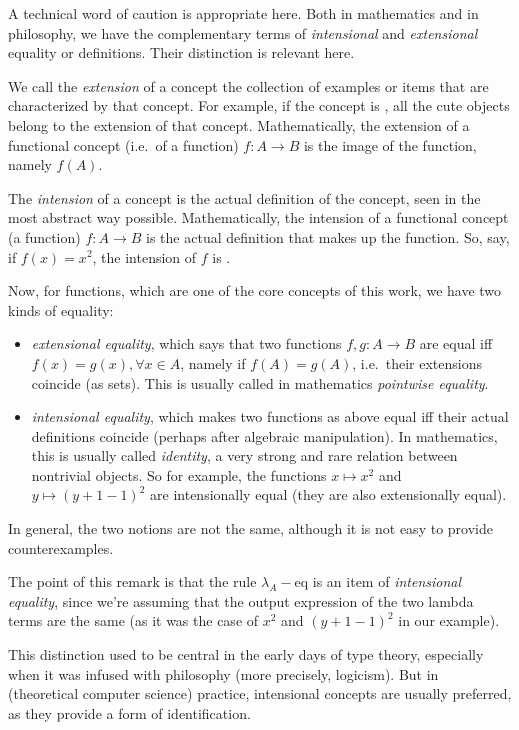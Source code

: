 \begin{remark}\label{rk:int-ext}
  A technical word of caution is appropriate here. Both in mathematics
  and in philosophy, we have the complementary terms of \emph{intensional}
  and \emph{extensional} equality or definitions. Their distinction is
  relevant here.

  We call the \emph{extension} of a concept the collection of examples
  or items that are characterized by that concept. For example, if the
  concept is , all the cute objects belong to the extension
  of that concept. Mathematically, the extension of a functional concept
  (i.e.\ of a function) $ f : A \to B $ is the image of the function,
  namely $ f(A) $.

  The \emph{intension} of a concept is the actual definition of the concept,
  seen in the most abstract way possible. Mathematically, the intension of a
  functional concept (a function) $ f : A \to B $ is the actual definition
  that makes up the function. So, say, if $ f(x) = x^2 $, the intension of
  $ f $ is .

  Now, for functions, which are one of the core concepts of this work,
  we have two kinds of equality:
  \begin{itemize}
  \item \emph{extensional equality}, which says that two functions
    $ f, g : A \to B $ are equal iff $ f(x) = g(x), \forall x \in A $,
    namely if $ f(A) = g(A) $, i.e.\ their extensions coincide (as sets).
    This is usually called in mathematics \emph{pointwise equality}.
  \item \emph{intensional equality}, which makes two functions as above
    equal iff their actual definitions coincide (perhaps after algebraic
    manipulation). In mathematics, this is usually called \emph{identity},
    a very strong and rare relation between nontrivial objects.
    So for example, the functions $ x \mapsto x^2 $ and
    $ y \mapsto (y + 1 - 1)^2 $ are intensionally equal (they are also
    extensionally equal).
  \end{itemize}
  In general, the two notions are not the same, although it is not easy to
  provide counterexamples.

  The point of this remark is that the rule $ \lambda_A-\text{eq} $ is an
  item of \emph{intensional equality}, since we're assuming that the output
  expression of the two lambda terms are the same (as it was the case of
  $ x^2 $ and $ (y + 1 - 1)^2 $ in our example).

  This distinction used to be central in the early days of type theory,
  especially when it was infused with philosophy (more precisely, logicism).
  But in (theoretical computer science) practice, intensional concepts are
  usually preferred, as they provide a  form of identification.
\end{remark}


